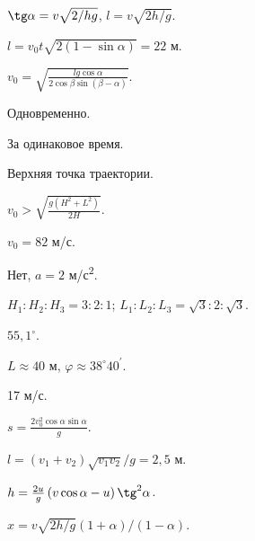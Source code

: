 \begin{Answer}{22}
$\tg \alpha = v \sqrt{2/hg}$, $l = v \sqrt{2h/g}$.
\end{Answer}
\begin{Answer}{23}
$l = v_0 t \sqrt{2(1-\sin \alpha)} = 22$ м.
\end{Answer}
\begin{Answer}{24}
$v_0 = \sqrt{\frac{lg \cos \alpha}{2 \cos \beta \sin \left( \beta - \alpha \right)}}$.
\end{Answer}
\begin{Answer}{25}
Одновременно.
\end{Answer}
\begin{Answer}{26}
За одинаковое время.
\end{Answer}
\begin{Answer}{27}
Верхняя точка траектории.
\end{Answer}
\begin{Answer}{28}
$v_0 > \sqrt{\frac{g(H^2+L^2)}{2H}}$.
\end{Answer}
\begin{Answer}{29}
$v_0 = 82$ м/с.
\end{Answer}
\begin{Answer}{30}
Нет, $a = 2$ м/с\textsuperscript{2}.
\end{Answer}
\begin{Answer}{31}
$H_1 : H_2 : H_3 = 3 : 2 : 1$; $L_1 : L_2 : L_3 = \sqrt{3} : 2 : \sqrt{3}$.
\end{Answer}
\begin{Answer}{32}
$55,1^{ \circ }$.
\end{Answer}
\begin{Answer}{33}
$L \approx 40$ м, $\varphi \approx 38^{\circ}40^\prime$.
\end{Answer}
\begin{Answer}{34}
17 м/с.
\end{Answer}
\begin{Answer}{35}
$s = \frac{2 v_0^2 \cos \alpha \sin \alpha}{g}$.
\end{Answer}
\begin{Answer}{36}
$l = (v_1 + v_2)\sqrt{v_1 v_2}/g = 2,5$ м.
\end{Answer}
\begin{Answer}{37}
$h = \frac{2u}{g}\left( v \cos \alpha - u \right) \tg^2 \alpha$.
\end{Answer}
\begin{Answer}{38}
$x = v \sqrt{2h/g} \left( 1 + \alpha \right) / \left( 1 - \alpha \right)$.
\end{Answer}
